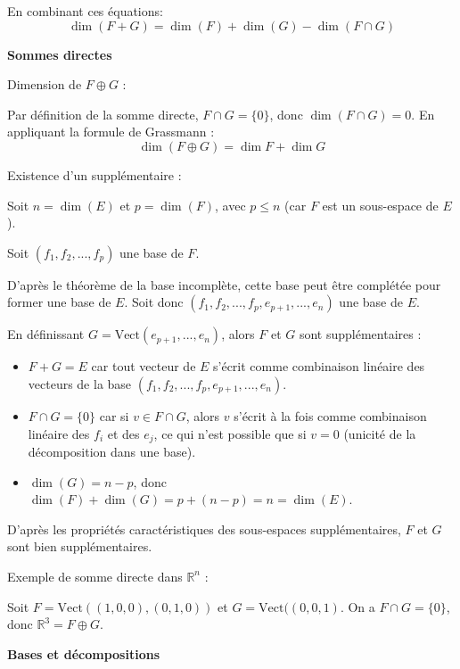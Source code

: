 \documentclass[10pt,a4paper]{article}
\begin{document}
En combinant ces équations:
\[ \dim(F + G) = \dim(F) + \dim(G) - \dim(F \cap G) \]

\bigskip
\textbf{Sommes directes}

\q Dimension de $F \oplus G$ :

Par définition de la somme directe, $F \cap G = \{0\}$, donc $\dim(F \cap G) = 0$. En appliquant la
formule de Grassmann :
\[\dim(F \oplus G) = \dim F + \dim G \]


\q Existence d'un supplémentaire :

Soit $n = \dim(E)$ et $p = \dim(F)$, avec $p \leq n$ (car $F$ est un sous-espace de $E$).

Soit $(f_1, f_2, ..., f_p)$ une base de $F$.

D'après le théorème de la base incomplète, cette base peut être complétée pour former une base de
$E$. Soit donc $(f_1, f_2, ..., f_p, e_{p+1}, ..., e_n)$ une base de $E$.

En définissant $G = \text{Vect}(e_{p+1}, ..., e_n)$, alors $F$ et $G$ sont supplémentaires :
\begin{itemize}
    \item $F + G = E$ car tout vecteur de $E$ s'écrit comme combinaison linéaire des vecteurs de la
   base $(f_1, f_2, ..., f_p, e_{p+1}, ..., e_n)$.
    \item $F \cap G = \{0\}$ car si $v \in F \cap G$, alors $v$ s'écrit à la fois comme
   combinaison linéaire des $f_i$ et des $e_j$, ce qui n'est possible que si $v = 0$ (unicité de la
   décomposition dans une base).
    \item $\dim(G) = n - p$, donc $\dim(F) + \dim(G) = p + (n-p) = n = \dim(E)$.
\end{itemize}
D'après les propriétés caractéristiques des sous-espaces supplémentaires, $F$ et $G$ sont
bien supplémentaires.

\q Exemple de somme directe dans $\mathbb{R}^n$ :

Soit $F = \text{Vect}((1, 0, 0), (0, 1, 0))$ et $G = \text{Vect}((0, 0, 1)$. On a $F \cap G =
\{0\}$, donc $\mathbb{R}^3 = F \oplus G$.

\bigskip
\textbf{Bases et décompositions}
\end{document}
